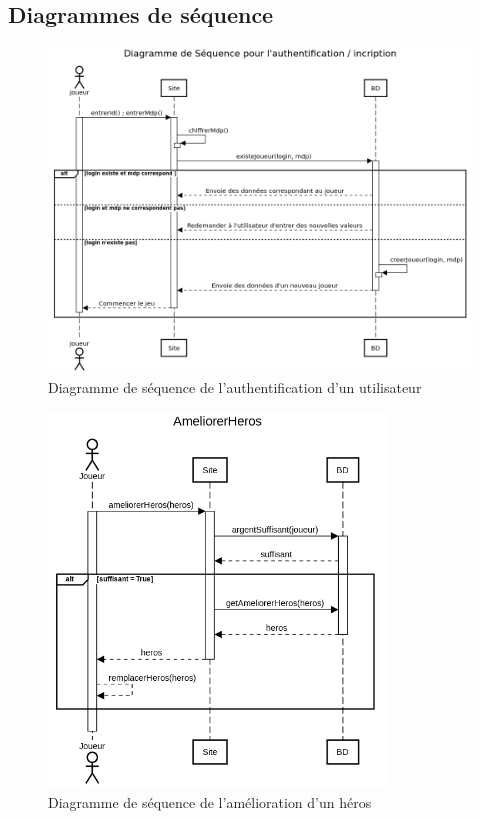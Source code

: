 \subsection{Diagrammes de séquence}

    \begin{figure}[ht!]
        \centering
            \includegraphics[width=1\textwidth]{images/Authentification.png}
        \caption{Diagramme de séquence de l'authentification d'un utilisateur}
    \end{figure}

    \begin{figure}[ht!]
        \centering
            \includegraphics[width=0.8\textwidth]{images/AmeliorerHeros.png}
        \caption{Diagramme de séquence de l'amélioration d'un héros}
    \end{figure}


